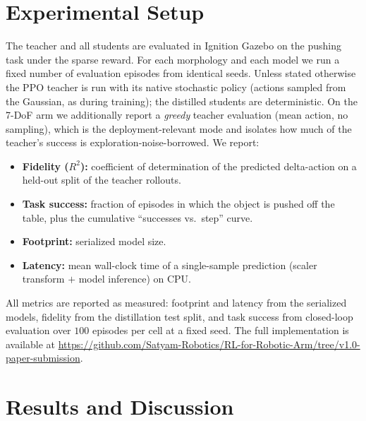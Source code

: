 \documentclass[conference]{IEEEtran}
\begin{document}
\section{Experimental Setup}
The teacher and all students are evaluated in Ignition Gazebo on the pushing task
under the sparse reward. For each morphology and each model we run a fixed number
of evaluation episodes from identical seeds. Unless stated otherwise the PPO
teacher is run with its native stochastic policy (actions sampled from the
Gaussian, as during training); the distilled students are deterministic. On the
7-DoF arm we additionally report a \emph{greedy} teacher evaluation (mean action,
no sampling), which is the deployment-relevant mode and isolates how much of the
teacher's success is exploration-noise-borrowed. We report:
\begin{itemize}
  \item \textbf{Fidelity ($R^2$):} coefficient of determination of the predicted
        delta-action on a held-out split of the teacher rollouts.
  \item \textbf{Task success:} fraction of episodes in which the object is pushed
        off the table, plus the cumulative ``successes vs.\ step'' curve.
  \item \textbf{Footprint:} serialized model size.
  \item \textbf{Latency:} mean wall-clock time of a single-sample prediction
        (scaler transform $+$ model inference) on CPU.
\end{itemize}
All metrics are reported as measured: footprint and latency from the serialized
models, fidelity from the distillation test split, and task success from
closed-loop evaluation over $100$ episodes per cell at a fixed seed.
The full implementation is available at \url{https://github.com/Satyam-Robotics/RL-for-Robotic-Arm/tree/v1.0-paper-submission}.

\section{Results and Discussion}
\end{document}
